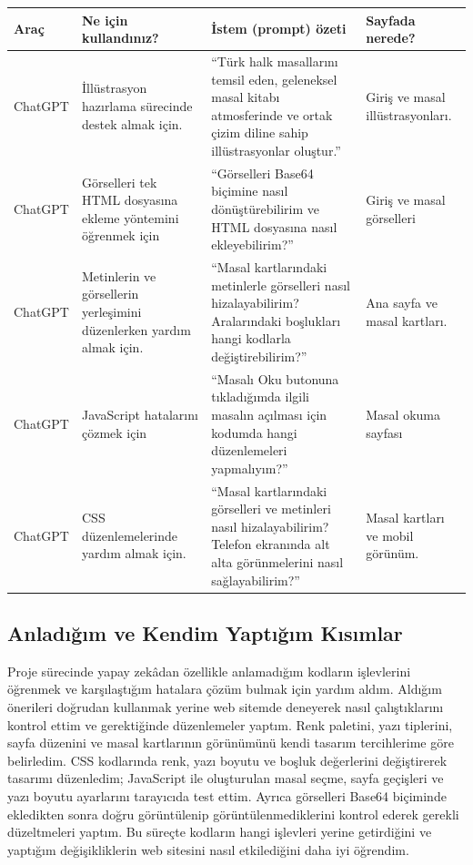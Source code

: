 \documentclass[12pt,a4paper]{article}
\begin{document}
\begin{longtable}{@{}p{2.6cm}p{3.6cm}p{4.2cm}p{3.4cm}@{}}
\toprule
\textbf{Araç} & \textbf{Ne için kullandınız?} & \textbf{İstem (prompt) özeti} & \textbf{Sayfada nerede?} \\
\midrule
\endhead
\relax ChatGPT & İllüstrasyon hazırlama sürecinde destek almak için. & “Türk halk masallarını temsil eden, geleneksel masal kitabı atmosferinde ve ortak çizim diline sahip illüstrasyonlar oluştur.” & Giriş ve masal illüstrasyonları. \\
\relax ChatGPT  & Görselleri tek HTML dosyasına ekleme yöntemini öğrenmek için & “Görselleri Base64 biçimine nasıl dönüştürebilirim ve HTML dosyasına nasıl ekleyebilirim?” & Giriş ve masal görselleri \\
\relax ChatGPT  & Metinlerin ve görsellerin yerleşimini düzenlerken yardım almak için. & “Masal kartlarındaki metinlerle görselleri nasıl hizalayabilirim? Aralarındaki boşlukları hangi kodlarla değiştirebilirim?” & Ana sayfa ve masal kartları. \\
\relax ChatGPT  & JavaScript hatalarını çözmek için& “Masalı Oku butonuna tıkladığımda ilgili masalın açılması için kodumda hangi düzenlemeleri yapmalıyım?” & Masal okuma sayfası \\
\relax ChatGPT  & CSS düzenlemelerinde yardım almak için. &“Masal kartlarındaki görselleri ve metinleri nasıl hizalayabilirim? Telefon ekranında alt alta görünmelerini nasıl sağlayabilirim?” & Masal kartları ve mobil görünüm. \\
\bottomrule
\end{longtable}

\subsection{Anladığım ve Kendim Yaptığım Kısımlar}
Proje sürecinde yapay zekâdan özellikle anlamadığım kodların işlevlerini öğrenmek ve karşılaştığım hatalara çözüm bulmak için yardım aldım. Aldığım önerileri doğrudan kullanmak yerine web sitemde deneyerek nasıl çalıştıklarını kontrol ettim ve gerektiğinde düzenlemeler yaptım. Renk paletini, yazı tiplerini, sayfa düzenini ve masal kartlarının görünümünü kendi tasarım tercihlerime göre belirledim. CSS kodlarında renk, yazı boyutu ve boşluk değerlerini değiştirerek tasarımı düzenledim; JavaScript ile oluşturulan masal seçme, sayfa geçişleri ve yazı boyutu ayarlarını tarayıcıda test ettim. Ayrıca görselleri Base64 biçiminde ekledikten sonra doğru görüntülenip görüntülenmediklerini kontrol ederek gerekli düzeltmeleri yaptım. Bu süreçte kodların hangi işlevleri yerine getirdiğini ve yaptığım değişikliklerin web sitesini nasıl etkilediğini daha iyi öğrendim.
\end{document}
